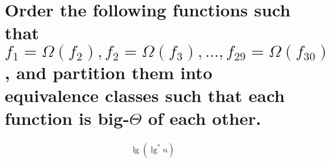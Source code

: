 \section[Problem 6]{Order the following functions such that $f_1 = \Omega(f_2), f_2 = \Omega(f_3), ..., f_{29} = \Omega(f_{30})$, and partition them into equivalence classes such that each function is big-$\Theta$ of each other.}

\begin{align*}
	\lg (\lg ^* n)
\end{align*}
